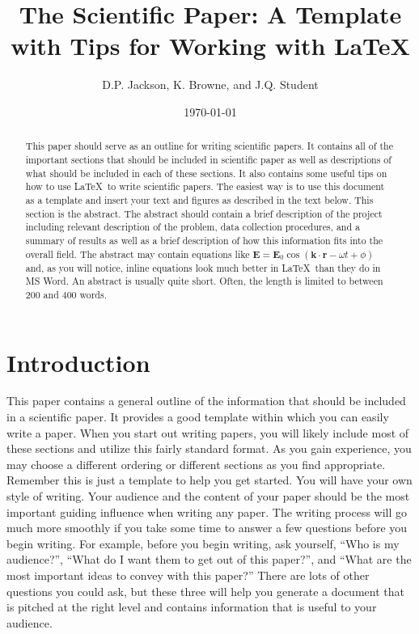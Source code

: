 \documentclass[preprint,pre,floats,aps,amsmath,amssymb]{revtex4}
\begin{document}
\title{The Scientific Paper: A Template with Tips for Working with
\LaTeX}
\author{D.P. Jackson, K. Browne, and J.Q. Student}
\date{\today}

\begin{abstract}
This paper should serve as an outline for writing scientific papers.
It contains all of the important sections that should be included in
scientific paper as well as descriptions of what should be included in
each of these sections. It also contains some useful tips on how to
use \LaTeX\ to write scientific papers.  The easiest way is to use
this document as a template and insert your text and figures as
described in the text below. This section is the abstract.  The
abstract should contain a brief description of the project including
relevant description of the problem, data collection procedures, and a
summary of results as well as a brief description of how this
information fits into the overall field.  The abstract may contain
equations like $\textbf{E}=\textbf{E}_0\cos
(\textbf{k}\cdot\textbf{r}-\omega t+\phi)$ and, as you will notice,
inline equations look much better in \LaTeX\ than they do in MS Word.
An abstract is usually quite short. Often, the length is limited to
between 200 and 400 words.
\end{abstract}

\maketitle

\section{Introduction}
\label{sec:intro}

This paper contains a general outline of the information that should
be included in a scientific paper.  It provides a good template within
which you can easily write a paper.    When you start out writing
papers, you will likely include most of these sections and utilize
this fairly standard format. As you gain experience, you may choose a
different ordering or different sections as you find appropriate. 
Remember this is just a template to help you get started.  You will
have your own style of writing. Your audience and the content of your
paper should be the most important guiding influence when writing any
paper.  The writing process will go much more smoothly if you take
some time to answer a few questions before you begin writing. For
example, before you begin writing, ask yourself, ``Who is my
audience?'', ``What do I want them to get out of this paper?'', and
``What are the most important ideas to convey with this paper?'' 
There are lots of other questions you could ask, but these three will
help you generate a document that is pitched at the right level and
contains information that is useful to your audience.
\end{document}
